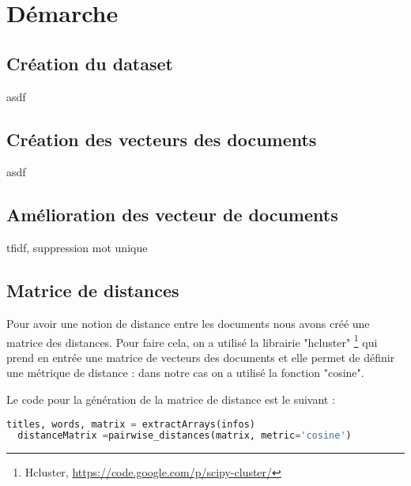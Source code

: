\chapter{Démarche}
\section{Création du dataset}

asdf



\section{Création des vecteurs des documents}

asdf


\section{Amélioration des vecteur de documents}

tfidf, suppression mot unique



\section{Matrice de distances}

\label{matrice-distance}
Pour avoir une notion de distance entre les documents nous avons créé une matrice des distances. Pour faire cela, on a utilisé la librairie "hcluster" \footnote{Hcluster, \url{https://code.google.com/p/scipy-cluster/}} qui prend en entrée une matrice de vecteurs des documents et elle permet de définir une métrique de distance : dans notre cas on a utilisé la fonction "cosine".

Le code pour la génération de la matrice de distance est le suivant : \\

\begin{lstlisting}[language=python]
  titles, words, matrix = extractArrays(infos)
  distanceMatrix =pairwise_distances(matrix, metric='cosine')
\end{lstlisting}


